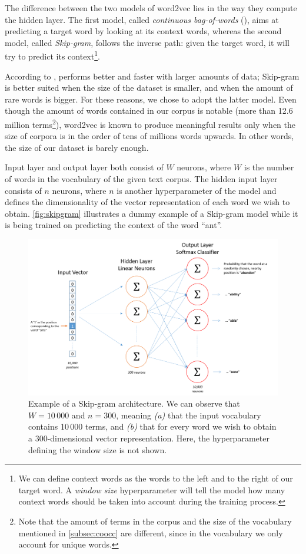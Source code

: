 The difference between the two models of word2vec lies in the way they compute the hidden layer. The first model, called \emph{continuous bag-of-words} (), aims at predicting a target word by looking at its context words, whereas the second model, called \emph{Skip-gram}, follows the inverse path: given the target word, it will try to predict its context\footnote{We can define context words as the words to the left and to the right of our target word. A \emph{window size} hyperparameter will tell the model how many context words should be taken into account during the training process.}.

According to \citeauthor{mikolov2013efficient},  performs better and faster with larger amounts of data; Skip-gram is better suited when the size of the dataset is smaller, and when the amount of rare words is bigger. For these reasons, we chose to adopt the latter model. Even though the amount of words contained in our corpus is notable (more than 12.6 million terms\footnote{Note that the amount of terms in the corpus and the size of the vocabulary mentioned in \autoref{subsec:coocc} are different, since in the vocabulary we only account for unique words.}), word2vec is known to produce meaningful results only when the size of corpora is in the order of tens of millions words upwards. In other words, the size of our dataset is barely enough.

Input layer and output layer both consist of $W$ neurons, where $W$ is the number of
words in the vocabulary of the given text corpus. The hidden input layer consists of $n$ neurons, where $n$ is another hyperparameter of the model and defines the dimensionality of the vector representation of each word we wish to obtain. \autoref{fig:skipgram} illustrates a dummy example of a Skip-gram model while it is being trained on predicting the context of the word ``ant''.

\begin{figure}[bth]
	\myfloatalign
	\includegraphics[width=\linewidth]{gfx/word2vec_arch}
	\caption[Architecture of a word2vec skip-gram model]{Example of a Skip-gram architecture. We can observe that $W = 10\,000$ and $n = 300$, meaning \emph{(a)} that the input vocabulary contains 10\,000 terms, and \emph{(b)} that for every word we wish to obtain a 300-dimensional vector representation. Here, the hyperparameter defining the window size is not shown.}
	\label{fig:skipgram}
\end{figure}

